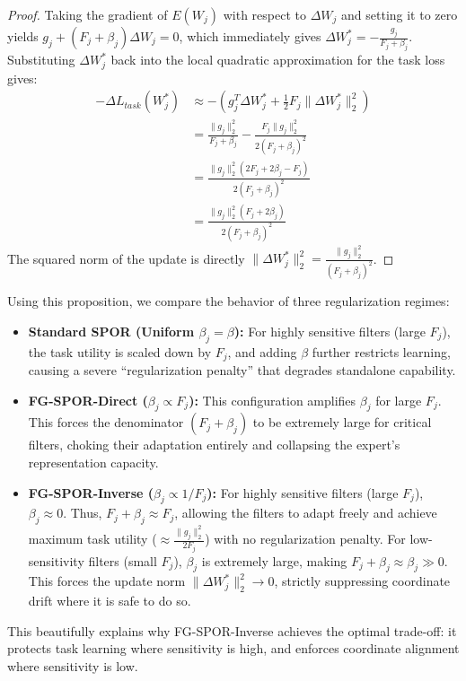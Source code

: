 \documentclass{article}
\theoremstyle{plain}
\theoremstyle{definition}
\theoremstyle{remark}
\begin{document}
\begin{proof}
Taking the gradient of $E(W_j)$ with respect to $\Delta W_j$ and setting it to zero yields $g_j + (F_j + \beta_j) \Delta W_j = 0$, which immediately gives $\Delta W_j^* = -\frac{g_j}{F_j + \beta_j}$. Substituting $\Delta W_j^*$ back into the local quadratic approximation for the task loss gives:
\begin{align*}
    -\Delta L_{task}(W_j^*) &\approx - \left( g_j^T \Delta W_j^* + \frac{1}{2} F_j \|\Delta W_j^*\|_2^2 \right) \\
    &= \frac{\|g_j\|_2^2}{F_j + \beta_j} - \frac{F_j \|g_j\|_2^2}{2 (F_j + \beta_j)^2} \\
    &= \frac{\|g_j\|_2^2 (2 F_j + 2 \beta_j - F_j)}{2 (F_j + \beta_j)^2} \\
    &= \frac{\|g_j\|_2^2 (F_j + 2 \beta_j)}{2 (F_j + \beta_j)^2}
\end{align*}
The squared norm of the update is directly $\|\Delta W_j^*\|_2^2 = \frac{\|g_j\|_2^2}{(F_j + \beta_j)^2}$.
\end{proof}

Using this proposition, we compare the behavior of three regularization regimes:
\begin{itemize}
    \item \textbf{Standard SPOR (Uniform $\beta_j = \beta$):} For highly sensitive filters (large $F_j$), the task utility is scaled down by $F_j$, and adding $\beta$ further restricts learning, causing a severe ``regularization penalty'' that degrades standalone capability.
    \item \textbf{FG-SPOR-Direct ($\beta_j \propto F_j$):} This configuration amplifies $\beta_j$ for large $F_j$. This forces the denominator $(F_j + \beta_j)$ to be extremely large for critical filters, choking their adaptation entirely and collapsing the expert's representation capacity.
    \item \textbf{FG-SPOR-Inverse ($\beta_j \propto 1/F_j$):} For highly sensitive filters (large $F_j$), $\beta_j \approx 0$. Thus, $F_j + \beta_j \approx F_j$, allowing the filters to adapt freely and achieve maximum task utility ($\approx \frac{\|g_j\|_2^2}{2 F_j}$) with no regularization penalty. For low-sensitivity filters (small $F_j$), $\beta_j$ is extremely large, making $F_j + \beta_j \approx \beta_j \gg 0$. This forces the update norm $\|\Delta W_j^*\|_2^2 \to 0$, strictly suppressing coordinate drift where it is safe to do so.
\end{itemize}
This beautifully explains why FG-SPOR-Inverse achieves the optimal trade-off: it protects task learning where sensitivity is high, and enforces coordinate alignment where sensitivity is low.
\end{document}
